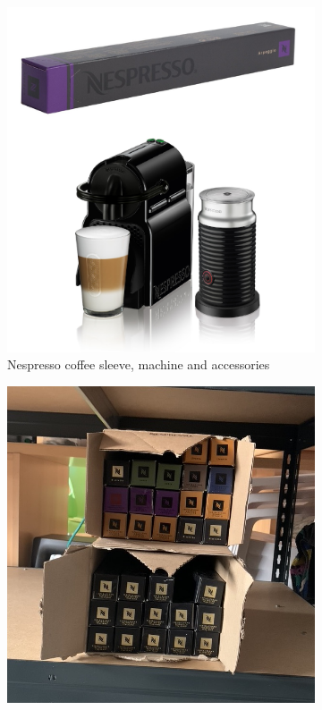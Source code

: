 \begin{figure}
    \centering
    \begin{subfigure}{.45\textwidth}
        \centering
        \includegraphics[width=\linewidth]{./figs/02-state-of-the-art/sleeve.pdf}
        \caption{Nespresso coffee sleeve, machine and accessories} 
        \label{fig:sleeve}
    \end{subfigure}
    \begin{subfigure}{.45\textwidth}
        \centering
        \includegraphics[width=\linewidth]{./figs/02-state-of-the-art/sleeveboxes.jpeg}

\end{subfigure}
\end{figure}
